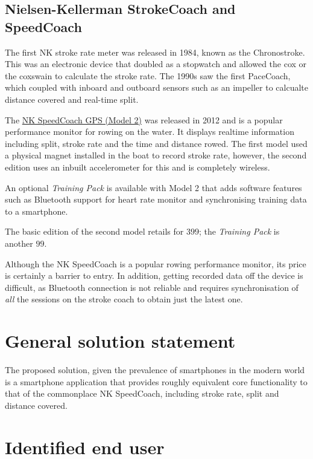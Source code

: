 \documentclass[11pt,twoside,a4paper]{report}
\begin{document}
\subsection{Nielsen-Kellerman StrokeCoach and SpeedCoach}

The first NK stroke rate meter was released in 1984, known as the Chronostroke. This was an electronic device that doubled as a stopwatch and allowed the cox or the coxswain to calculate the stroke rate. The 1990s saw the first PaceCoach, which coupled with inboard and outboard sensors such as an impeller to calcualte distance covered and real-time split.\cite{pacecoach}

The \href{https://nksports.com/speedcoach-gps-2}{NK SpeedCoach GPS (Model 2)} was released in 2012 and is a popular performance monitor for rowing on the water. 
It displays realtime information including split, stroke rate and the time and distance rowed. 
The first model used a physical magnet installed in the boat to record stroke rate, however, the second edition uses an inbuilt accelerometer for this and is completely wireless. 

An optional \textit{Training Pack} is available with Model 2 that adds software features such as Bluetooth support for heart rate monitor and synchronising training data to a smartphone.

The basic edition of the second model retails for \textsterling $399$; the \textit{Training Pack} is another \textsterling $99$.

Although the NK SpeedCoach is a popular rowing performance monitor, its price is certainly a barrier to entry. In addition, getting recorded data off the device is difficult, as Bluetooth connection is not reliable and requires synchronisation of \textit{all} the sessions on the stroke coach to obtain just the latest one.

\section{General solution statement}

The proposed solution, given the prevalence of smartphones in the modern world is a smartphone application that provides roughly equivalent core functionality to that of the commonplace NK SpeedCoach, including stroke rate, split and distance covered.

\section{Identified end user}
\end{document}
